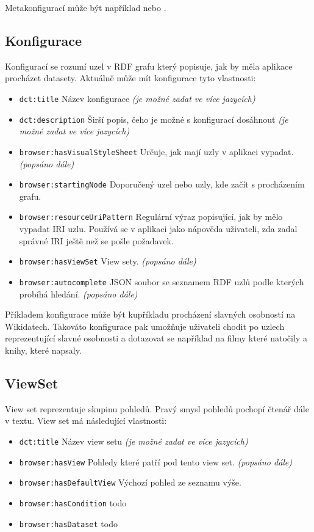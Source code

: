 Metakonfigurací může být například  nebo .

\subsection{Konfigurace} \label{pozadavky-konfigurace}
Konfigurací se rozumí uzel v RDF grafu který popisuje, jak by měla aplikace procházet datasety. Aktuálně může mít konfigurace tyto vlastnosti:

\begin{itemize}
    \item \texttt{dct:title} Název konfigurace \textit{(je možné zadat ve více jazycích)}
    \item \texttt{dct:description} Širší popis, čeho je možné s konfigurací dosáhnout \textit{(je možné zadat ve více jazycích)}
    \item \texttt{browser:hasVisualStyleSheet} Určuje, jak mají uzly v aplikaci vypadat. \textit{(popsáno dále)}
    \item \texttt{browser:startingNode} Doporučený uzel nebo uzly, kde začít s procházením grafu.
    \item \texttt{browser:resourceUriPattern} Regulární výraz popisující, jak by mělo vypadat IRI uzlu. Používá se v aplikaci jako nápověda uživateli, zda zadal správné IRI ještě než se pošle požadavek.
    \item \texttt{browser:hasViewSet} View sety. \textit{(popsáno dále)}
    \item \texttt{browser:autocomplete} JSON soubor se seznamem RDF uzlů podle kterých probíhá hledání. \textit{(popsáno dále)}
\end{itemize}

Příkladem konfigurace může být kupříkladu procházení slavných osobností na Wikidatech. Takováto konfigurace pak umožňuje uživateli chodit po uzlech reprezentující slavné osobnosti a dotazovat se například na filmy které natočily a knihy, které napsaly.

\subsection{ViewSet} \label{pozadavky-view-sets}
View set reprezentuje skupinu pohledů. Pravý smysl pohledů pochopí čtenář dále v textu. View set má následující vlastnosti:
\begin{itemize}
    \item \texttt{dct:title} Název view setu \textit{(je možné zadat ve více jazycích)}
    \item \texttt{browser:hasView} Pohledy které patří pod tento view set. \textit{(popsáno dále)}
    \item \texttt{browser:hasDefaultView} Výchozí pohled ze seznamu výše.
    \item \texttt{browser:hasCondition} todo
    \item \texttt{browser:hasDataset} todo
\end{itemize}

